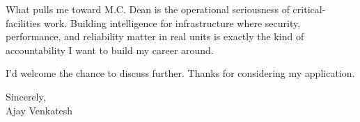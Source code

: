 \documentclass[letterpaper,11pt]{article}
\begin{document}
What pulls me toward M.C. Dean is the operational seriousness of critical-facilities work. Building intelligence for infrastructure where security, performance, and reliability matter in real units is exactly the kind of accountability I want to build my career around.

I'd welcome the chance to discuss further. Thanks for considering my application.

\vspace{12pt}
Sincerely, \\
Ajay Venkatesh
\end{document}
